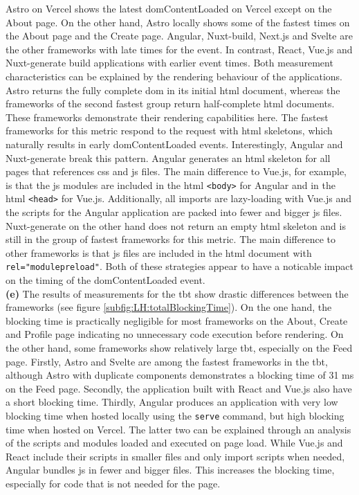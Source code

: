 \documentclass[a4paper, 12pt]{article}
\begin{document}
Astro on Vercel shows the latest domContentLoaded on Vercel except on the About page.
On the other hand, Astro locally shows some of the fastest times on the About page and the Create page.
Angular, Nuxt-build, Next.js and Svelte are the other frameworks with late times for the event.
In contrast, React, Vue.js and Nuxt-generate build applications with earlier event times.
Both measurement characteristics can be explained by the rendering behaviour of the applications.
Astro returns the fully complete \acrshort{dom} in its initial \acrshort{html} document, whereas the frameworks of the second fastest group return half-complete \acrshort{html} documents.
These frameworks demonstrate their rendering capabilities here.
The fastest frameworks for this metric respond to the request with \acrshort{html} skeletons, which naturally results in early domContentLoaded events.
Interestingly, Angular and Nuxt-generate break this pattern.
Angular generates an \acrshort{html} skeleton for all pages that references \acrshort{css} and \acrshort{js} files.
The main difference to Vue.js, for example, is that the \acrshort{js} modules are included in the \acrshort{html} \verb|<body>| for Angular and in the \acrshort{html} \verb|<head>| for Vue.js.
Additionally, all imports are lazy-loading with Vue.js and the scripts for the Angular application are packed into fewer and bigger \acrshort{js} files.
Nuxt-generate on the other hand does not return an empty \acrshort{html} skeleton and is still in the group of fastest frameworks for this metric.
The main difference to other frameworks is that \acrshort{js} files are included in the \acrshort{html} document with \verb|rel="modulepreload"|.
Both of these strategies appear to have a noticable impact on the timing of the domContentLoaded event.
\\

\textbf{(e)} The results of measurements for the \acrlong{tbt} show drastic differences between the frameworks (see figure \ref{subfig:LH:totalBlockingTime}).
On the one hand, the blocking time is practically negligible for most frameworks on the About, Create and Profile page indicating no unnecessary code execution before rendering.
On the other hand, some frameworks show relatively large \acrshort{tbt}, especially on the Feed page.
Firstly, Astro and Svelte are among the fastest frameworks in the \acrshort{tbt}, although Astro with duplicate components demonstrates a blocking time of 31 ms on the Feed page.
Secondly, the application built with React and Vue.js also have a short blocking time.
Thirdly, Angular produces an application with very low blocking time when hosted locally using the \verb|serve| command, but high blocking time when hosted on Vercel.
The latter two can be explained through an analysis of the scripts and modules loaded and executed on page load.
While Vue.js and React include their scripts in smaller files and only import scripts when needed, Angular bundles \acrlong{js} in fewer and bigger files.
This increases the blocking time, especially for code that is not needed for the page.
\end{document}
